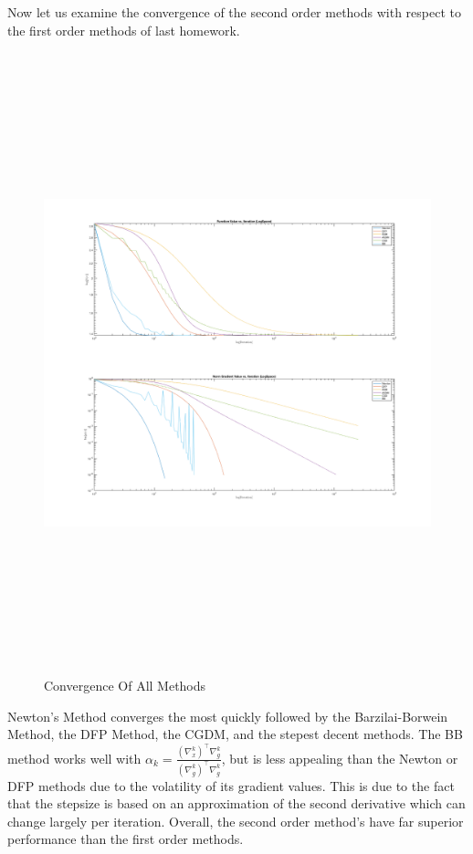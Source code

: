 \documentclass[answers]{exam}
\begin{document}
\begin{framed}
    Now let us examine the convergence of the second order methods with respect to the first order methods of last homework. 
    \begin{figure}[H]
    \centering
        \caption{Convergence  Of All Methods}
    \includegraphics[width=\linewidth, height=18cm]{Problem2_TOGETHER.png}
    \end{figure} 
    
Newton's Method converges the most quickly followed by the Barzilai-Borwein Method, the DFP Method, the CGDM, and the stepest decent methods. The BB method works well with $\alpha_k = \frac{(\nabla_x^k)^{\top} \nabla_g^{k}}{(\nabla_g^{k})^{\top} \nabla_g^{k}}$, but is less appealing than the Newton or DFP methods due to the volatility of its gradient values. This is due to the fact that the stepsize is based on an approximation of the second derivative which can change largely per iteration. Overall, the second order method's have far superior performance than the first order methods. 
    

    
\end{framed}
\newpage
\end{document}
